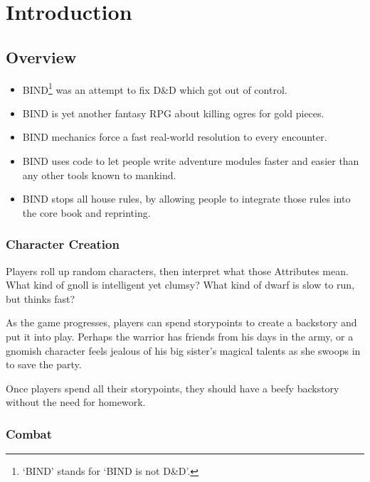 \chapter*{Introduction}

\section*{Overview}

\begin{multicols}{2}

\begin{itemize}

	\item
	BIND\footnote{`BIND' stands for `BIND is not D\&D'.} was an attempt to fix D\&D which got out of control.
	\item
	BIND is yet another fantasy RPG about killing ogres for gold pieces.
	\item
	BIND mechanics force a fast real-world resolution to every encounter.
	\item
	BIND uses code to let people write adventure modules faster and easier than any other tools known to mankind.
	\item
	BIND stops all house rules, by allowing people to integrate those rules into the core book and reprinting.

\end{itemize}

\subsection*{Character Creation}

Players roll up random characters, then interpret what those Attributes mean.
What kind of gnoll is intelligent yet clumsy?
What kind of dwarf is slow to run, but thinks fast?

As the game progresses, players can spend \glspl{storypoint} to create a backstory and put it into play.
Perhaps the warrior has friends from his days in the army, or a gnomish character feels jealous of his big sister's magical talents as she swoops in to save the party.

Once players spend all their \glspl{storypoint}, they should have a beefy backstory without the need for homework.

\subsection*{Combat}


\end{multicols}
